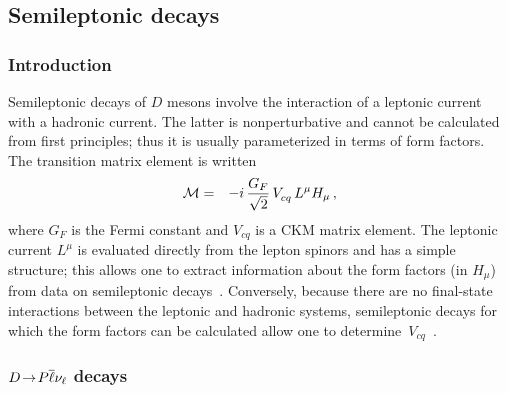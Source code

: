 \subsection{Semileptonic decays}
\label{sec:charm:semileptonic}

\subsubsection{Introduction}

Semileptonic decays of $D$ mesons involve the interaction of a leptonic
current with a hadronic current. The latter is nonperturbative
and cannot be calculated from first principles; thus it is usually
parameterized in terms of form factors. The transition matrix element 
is written
\begin{eqnarray}
  {\cal M} & = & -i\,\frac{G_F}{\sqrt{2}}\,V^{}_{cq}\,L^\mu H_\mu\,,
  \label{Melem}
\end{eqnarray}
where $G_F$ is the Fermi constant and $V^{}_{cq}$ is a CKM matrix element.
The leptonic current $L^\mu$ is evaluated directly from the lepton spinors 
and has a simple structure; this allows one to extract information about 
the form factors (in $H^{}_\mu$) from data on semileptonic decays~\cite{Becher:2005bg}.  
Conversely, because there are no final-state interactions between the
leptonic and hadronic systems, semileptonic decays for which the form 
factors can be calculated allow one to 
determine~$V^{}_{cq}$~\cite{Kobayashi:1973fv}.

\subsubsection{$D\!\rightarrow\! P \overline \ell \nu_{\ell}$ decays}

